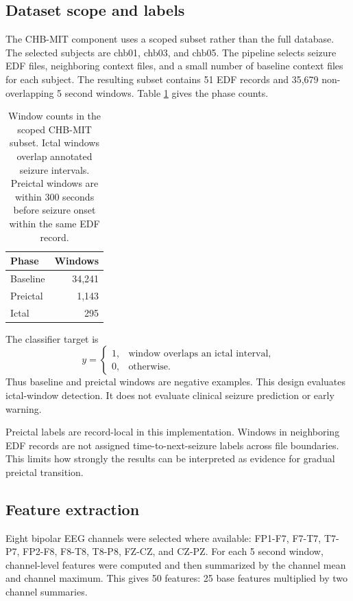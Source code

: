 \documentclass[11pt]{article}
\begin{document}
\subsection{Dataset scope and labels}

The CHB-MIT component uses a scoped subset rather than the full database. The selected subjects are chb01, chb03, and chb05. The pipeline selects seizure EDF files, neighboring context files, and a small number of baseline context files for each subject. The resulting subset contains 51 EDF records and 35,679 non-overlapping 5 second windows. Table \ref{tab:classbalance} gives the phase counts.

\begin{table}[H]
\centering
\caption{Window counts in the scoped CHB-MIT subset. Ictal windows overlap annotated seizure intervals. Preictal windows are within 300 seconds before seizure onset within the same EDF record.}
\label{tab:classbalance}
\begin{tabular}{lr}
\toprule
Phase & Windows \\
\midrule
Baseline & 34,241 \\
Preictal & 1,143 \\
Ictal & 295 \\
\bottomrule
\end{tabular}
\end{table}

The classifier target is
\begin{equation}
y = \begin{cases}
1, & \text{window overlaps an ictal interval},\\
0, & \text{otherwise.}
\end{cases}
\end{equation}
Thus baseline and preictal windows are negative examples. This design evaluates ictal-window detection. It does not evaluate clinical seizure prediction or early warning.

Preictal labels are record-local in this implementation. Windows in neighboring EDF records are not assigned time-to-next-seizure labels across file boundaries. This limits how strongly the results can be interpreted as evidence for gradual preictal transition.

\subsection{Feature extraction}

Eight bipolar EEG channels were selected where available: FP1-F7, F7-T7, T7-P7, FP2-F8, F8-T8, T8-P8, FZ-CZ, and CZ-PZ. For each 5 second window, channel-level features were computed and then summarized by the channel mean and channel maximum. This gives 50 features: 25 base features multiplied by two channel summaries.
\end{document}
